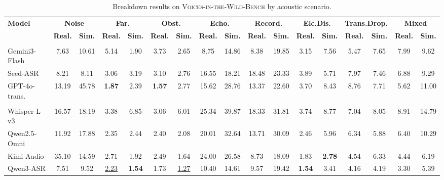 \documentclass{article}
\begin{document}
\begin{table}[t]
\centering
\caption{Breakdown results on \textsc{Voices-in-the-Wild-Bench} by acoustic scenario.}
\vspace{-1mm}
\label{tab:world_breakdown}
{\footnotesize
\setlength{\tabcolsep}{2pt}
\begin{tabular}{lcccccccccccccccc}
\toprule
\multirow{2}{*}{\textbf{Model}}
& \multicolumn{2}{c}{\textbf{Noise}}
& \multicolumn{2}{c}{\textbf{Far.}}
& \multicolumn{2}{c}{\textbf{Obst.}}
& \multicolumn{2}{c}{\textbf{Echo.}}
& \multicolumn{2}{c}{\textbf{Record.}}
& \multicolumn{2}{c}{\textbf{Elc.Dis.}}
& \multicolumn{2}{c}{\textbf{Trans.Drop.}}
& \multicolumn{2}{c}{\textbf{Mixed}} \\
\cmidrule(lr){2-3}
\cmidrule(lr){4-5}
\cmidrule(lr){6-7}
\cmidrule(lr){8-9}
\cmidrule(lr){10-11}
\cmidrule(lr){12-13}
\cmidrule(lr){14-15}
\cmidrule(lr){16-17}
& \textbf{Real.}
& \textbf{Sim.}
& \textbf{Real.}
& \textbf{Sim.}
& \textbf{Real.}
& \textbf{Sim.}
& \textbf{Real.}
& \textbf{Sim.}
& \textbf{Real.}
& \textbf{Sim.}
& \textbf{Real.}
& \textbf{Sim.}
& \textbf{Real.}
& \textbf{Sim.}
& \textbf{Real.}
& \textbf{Sim.} \\
\midrule
\rowcolor{headerblue}
\multicolumn{17}{l}{\textit{Closed-source models}} \\
Gemini3-Flash
& 7.63 & 10.61 & 5.14 & 1.90 & 3.73 & 2.65 & 8.75 & 14.86 & 8.38 & 19.85 & 3.15 & 7.56 & 5.47 & 7.65 & 7.99 & 9.62 \\
Seed-ASR
& 8.21 & 8.11 & 3.06 & 3.19 & 3.10 & 2.76 & 16.55 & 18.21 & 18.48 & 23.33 & 3.89 & 5.71 & 7.97 & 7.46 & 6.88 & 9.29 \\
GPT-4o-trans.
& 13.19 & 45.78 & \textbf{1.87} & 2.39 & \textbf{1.57} & 2.77 & 15.62 & 28.76 & 13.37 & 22.60 & 3.70 & 8.43 & 8.76 & 7.71 & 5.62 & 11.00 \\
\rowcolor{headerblue}
\multicolumn{17}{l}{\textit{Open-source models}} \\
Whisper-L-v3
& 16.57 & 18.19 & 3.38 & 6.85 & 3.06 & 6.01 & 25.34 & 39.87 & 18.33 & 31.81 & 3.74 & 8.77 & 7.04 & 8.05 & 8.91 & 14.79 \\
Qwen2.5-Omni
& 11.92 & 17.88 & 2.35 & 2.44 & 2.40 & 2.08 & 20.01 & 32.64 & 13.71 & 30.09 & 2.46 & 5.96 & 6.34 & 5.88 & 6.40 & 10.29 \\
Kimi-Audio
& 35.10 & 14.59 & 2.71 & 1.92 & 2.49 & 1.64 & 24.00 & 26.58 & 8.73 & 18.09 & 1.83 & \textbf{2.78} & 4.54 & 6.33 & 4.44 & 6.19 \\
Qwen3-ASR
& 7.51 & 9.52 & \underline{2.23} & \textbf{1.54} & 1.73 & \underline{1.27} & 10.40 & 14.61 & 9.57 & 19.42 & \textbf{1.54} & 3.41 & 4.16 & 4.19 & 3.30 & 5.39 \\

\end{tabular}}
\end{table}
\end{document}

